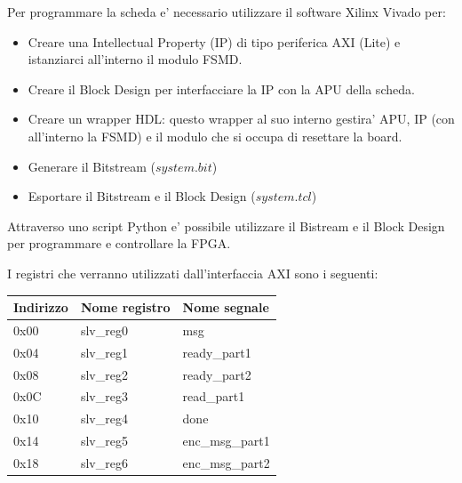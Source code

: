 \documentclass[a4paper]{article}
\begin{document}
Per programmare la scheda e' necessario utilizzare il software Xilinx Vivado per:
\begin{itemize}
    \item Creare una Intellectual Property (IP) di tipo periferica AXI (Lite) e istanziarci all'interno il modulo FSMD.
    
    \item Creare il Block Design per interfacciare la IP con la APU della scheda.
    
    \item Creare un wrapper HDL: questo wrapper al suo interno gestira' APU, IP (con all'interno la FSMD) e il modulo che si occupa di resettare la board.
    \item Generare il Bitstream ($system.bit$)
    \item Esportare il Bitstream e il Block Design ($system.tcl$)
\end{itemize}

Attraverso uno script Python e' possibile utilizzare il Bistream e il Block Design per programmare e controllare la FPGA.

I registri che verranno utilizzati dall'interfaccia AXI sono i seguenti:
\begin{table}[!ht]
    \centering
    \begin{tabular}{|l|l|l|}
    \hline
        Indirizzo & Nome registro & Nome segnale \\ \hline
        0x00 & slv\_reg0 & msg \\ \hline
        0x04 & slv\_reg1 & ready\_part1 \\ \hline
        0x08 & slv\_reg2 & ready\_part2 \\ \hline
        0x0C & slv\_reg3 & read\_part1 \\ \hline
        0x10 & slv\_reg4 & done \\ \hline
        0x14 & slv\_reg5 & enc\_msg\_part1 \\ \hline
        0x18 & slv\_reg6 & enc\_msg\_part2 \\ \hline
    \end{tabular}
\end{table}
\end{document}
